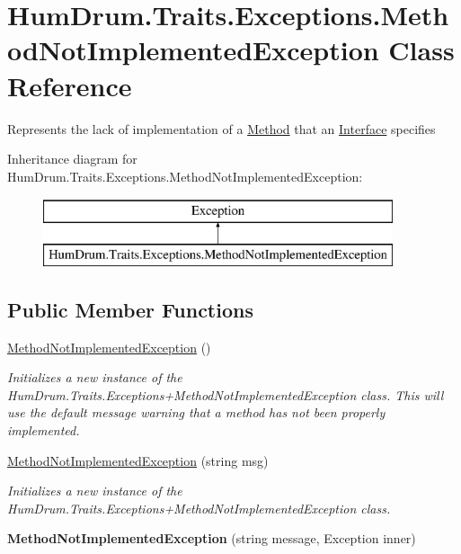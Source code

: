 \hypertarget{classHumDrum_1_1Traits_1_1Exceptions_1_1MethodNotImplementedException}{}\section{Hum\+Drum.\+Traits.\+Exceptions.\+Method\+Not\+Implemented\+Exception Class Reference}
\label{classHumDrum_1_1Traits_1_1Exceptions_1_1MethodNotImplementedException}


Represents the lack of implementation of a \hyperlink{classHumDrum_1_1Traits_1_1Method}{Method} that an \hyperlink{classHumDrum_1_1Traits_1_1Interface}{Interface} specifies  


Inheritance diagram for Hum\+Drum.\+Traits.\+Exceptions.\+Method\+Not\+Implemented\+Exception\+:\begin{figure}[H]
\begin{center}
\leavevmode
\includegraphics[height=2.000000cm]{classHumDrum_1_1Traits_1_1Exceptions_1_1MethodNotImplementedException}
\end{center}
\end{figure}
\subsection*{Public Member Functions}
\begin{DoxyCompactItemize}
\item 
\hyperlink{classHumDrum_1_1Traits_1_1Exceptions_1_1MethodNotImplementedException_a765e8aec8d09d894ee44f0d51ca626e4}{Method\+Not\+Implemented\+Exception} ()
\begin{DoxyCompactList}\small\item\em Initializes a new instance of the Hum\+Drum.\+Traits.\+Exceptions+\+Method\+Not\+Implemented\+Exception class. This will use the default message warning that a method has not been properly implemented. \end{DoxyCompactList}\item 
\hyperlink{classHumDrum_1_1Traits_1_1Exceptions_1_1MethodNotImplementedException_ad1356dbd030eda6d682496bd31d46b20}{Method\+Not\+Implemented\+Exception} (string msg)
\begin{DoxyCompactList}\small\item\em Initializes a new instance of the Hum\+Drum.\+Traits.\+Exceptions+\+Method\+Not\+Implemented\+Exception class. \end{DoxyCompactList}\item 
{\bfseries Method\+Not\+Implemented\+Exception} (string message, Exception inner)\hypertarget{classHumDrum_1_1Traits_1_1Exceptions_1_1MethodNotImplementedException_aadb01403cca52e9da7efacb3ff0b107c}{}\label{classHumDrum_1_1Traits_1_1Exceptions_1_1MethodNotImplementedException_aadb01403cca52e9da7efacb3ff0b107c}

\end{DoxyCompactItemize}


